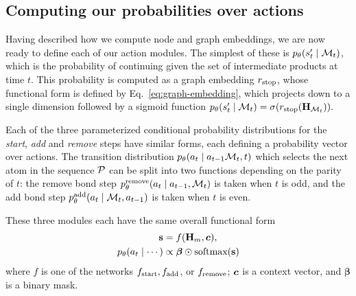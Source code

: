 \subsection{Computing our probabilities over actions}

Having described how we compute node and graph embeddings, we are now ready to define each of our action modules.
The simplest of these is $p_\theta(s'_t \mid {\mathcal{M}}_t)$, which is the probability of continuing given the set of intermediate products at time $t$. 
This probability is computed as a graph embedding $r_{\textrm{stop}}$,
whose functional form is defined by Eq.~\eqref{eq:graph-embedding}, which projects down to a single dimension followed by a sigmoid function
$
p_\theta(s'_t \mid {\mathcal{M}}_t) = \sigma(r_{\textrm{stop}}({\mathbf{H}}_{{\mathcal{M}}_t})).
$

Each of the three parameterized conditional probability distributions for the {\em start}, {\em add} and {\em remove} steps have similar forms, each defining a probability vector over actions.
The transition distribution $p_\theta(a_t \mid a_{t-1} {\mathcal{M}}_t, t)$ 
which selects the next atom in the sequence ${\mathcal{P}}$
can be split into two functions depending on the parity of $t$:
the remove bond step $p_\theta^\textrm{remove}(a_t \mid a_{t-1}, {\mathcal{M}}_t)$ is taken when $t$ is odd, 
and the add bond step $p_\theta^\textrm{add}(a_t \mid {\mathcal{M}}_t, a_{t-1})$ is taken when $t$ is even. 

These three modules each have the same overall functional form
\begin{align}
\textbf{s} &= f({\mathbf{H}}_{m}, \bm{c}), \\
p_\theta(a_t \mid \cdots) &\propto \bm{\beta} \odot \mbox{softmax}(\bm{\textbf{s}})
\end{align}
where $f$ is one of the networks $f_{\textrm{start}}, f_{\textrm{add}}$, or $f_{\textrm{remove}}$; 
$\bm{c}$ is a context vector, and $\bm{\beta}$ is a binary mask.

